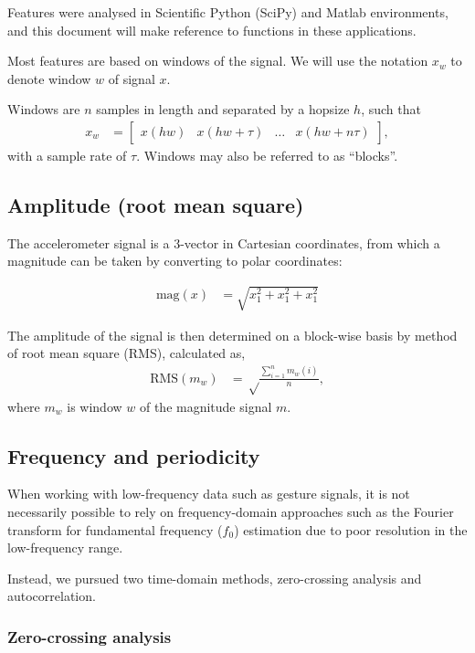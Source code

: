 \documentclass{article}
\begin{document}
Features were analysed in Scientific Python (SciPy) and Matlab
environments, and this document will make reference to functions in
these applications.

Most features are based on windows of the signal.  We will use the
notation $x_w$ to denote window $w$ of signal $x$.

Windows are $n$ samples in length and separated by a hopsize $h$, such
that
\begin{align}
x_w &= \left[\begin{array}{cccc}x(hw)&x(hw+\tau)&\dots&x(hw + n\tau)\end{array}\right],
\end{align}
with a sample rate of $\tau.$
Windows may also be referred to as ``blocks''.

\subsection{Amplitude (root mean square)}

The accelerometer signal is a 3-vector in Cartesian coordinates, from
which a magnitude can be taken by converting to polar coordinates:

\begin{align}
\textrm{mag}(x) &= \sqrt{x_1^2 + x_1^2 + x_1^2}
\end{align}

The amplitude of the signal is then determined on a block-wise basis
by method of root mean square (RMS), calculated as,
\begin{align}
\textrm{RMS}(m_w) &= \sqrt\frac{\sum^n_{i=1}{m_w(i)}}{n},
\end{align}
where $m_w$ is window $w$ of the magnitude signal $m$.

\subsection{Frequency and periodicity}

When working with low-frequency data such as gesture signals, it is
not necessarily possible to rely on frequency-domain approaches such
as the Fourier transform for fundamental frequency ($f_0$) estimation
due to poor resolution in the low-frequency range.

Instead, we pursued two time-domain methods, zero-crossing analysis
and autocorrelation.

\subsubsection{Zero-crossing analysis}
\end{document}
